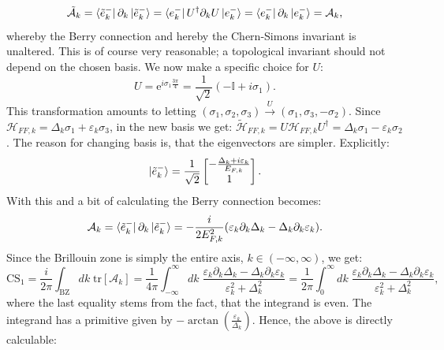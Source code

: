 \begin{equation}
\tilde{\mathcal{A}}_k = \bra{\tilde{e}^{-}_k}\partial_k\ket{\tilde{e}^{-}_k} = \bra{e^{-}_k}U^\dagger\partial_k U\ket{e^{-}_k} = \bra{e^{-}_k}\partial_k\ket{e^{-}_k} = \mathcal{A}_k, \nonumber 
\end{equation}
whereby the Berry connection and hereby the Chern-Simons invariant is unaltered. This is of course very reasonable; a topological invariant should not depend on the chosen basis. We now make a specific choice for $U$:
\begin{equation}
U = \text{e}^{i\sigma_1 \frac{3\pi}{4}} = \frac{1}{\sqrt{2}}\left(-\mathbb{I} + i\sigma_1\right). \nonumber 
\end{equation}
This transformation amounts to letting $(\sigma_1, \sigma_2, \sigma_3) \overset{U}{\to} (\sigma_1, \sigma_3, -\sigma_2)$. Since $\mathcal{H}_{FF,k} = \Delta_k\sigma_1 + \varepsilon_k\sigma_3$, in the new basis we get: $\tilde{\mathcal{H}}_{FF,k} = U\mathcal{H}_{FF,k}U^\dagger = \Delta_k\sigma_1 - \varepsilon_k\sigma_2$. The reason for changing basis is, that the eigenvectors are simpler. Explicitly:
\begin{equation}
\ket{\tilde{e}^{-}_k} = \frac{1}{\sqrt{2}}\begin{bmatrix} -\frac{\Delta_k + i \varepsilon_k}{E_{F,k}} \\ 1 \end{bmatrix}. \nonumber 
\end{equation}
With this and a bit of calculating the Berry connection becomes:
\begin{equation}
\mathcal{A}_k = \bra{\tilde{e}^{-}_k}\partial_k\ket{\tilde{e}^{-}_k} = -\frac{i}{2E^2_{F,k}}(\varepsilon_k\partial_k\Delta_k - \Delta_k \partial_k \varepsilon_k). \nonumber 
\end{equation}
Since the Brillouin zone is simply the entire axis, $k\in (-\infty, \infty)$, we get:
\begin{equation}
\text{CS}_1 = \frac{i}{2\pi}\int_{\text{BZ}} dk\; \text{tr}\left[\mathcal{A}_k\right] = \frac{1}{4\pi}\int_{-\infty}^{\infty} dk \;  \frac{\varepsilon_k\partial_k\Delta_k - \Delta_k \partial_k \varepsilon_k}{\varepsilon^2_k + \Delta^2_k} = \frac{1}{2\pi}\int_0^\infty dk \; \frac{\varepsilon_k\partial_k\Delta_k - \Delta_k \partial_k \varepsilon_k}{\varepsilon^2_k + \Delta^2_k}, 
\label{eq.CSinv1}
\end{equation}
where the last equality stems from the fact, that the integrand is even. The integrand has a primitive given by $-\arctan\left(\frac{\varepsilon_k}{\Delta_k}\right)$. Hence, the above is directly calculable:
